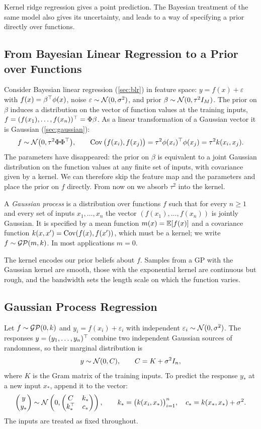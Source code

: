 Kernel ridge regression gives a point prediction. The Bayesian treatment of the same model also gives its uncertainty, and leads to a way of specifying a prior directly over functions.

\subsection{From Bayesian Linear Regression to a Prior over Functions}

Consider Bayesian linear regression (\cref{sec:blr}) in feature space: $y=f(x)+\varepsilon$ with $f(x)=\beta^{\top}\phi(x)$, noise $\varepsilon\sim\mathcal{N}(0,\sigma^2)$, and prior $\beta\sim\mathcal{N}(0,\tau^2I_M)$. The prior on $\beta$ induces a distribution on the vector of function values at the training inputs, $f=(f(x_1),\dots,f(x_n))^{\top}=\Phi\beta$. As a linear transformation of a Gaussian vector it is Gaussian (\cref{sec:gaussian}):
\[
f\sim\mathcal{N}\big(0,\tau^2\Phi\Phi^{\top}\big),\qquad\operatorname{Cov}\big(f(x_i),f(x_j)\big)=\tau^2\phi(x_i)^{\top}\phi(x_j)=\tau^2k(x_i,x_j).
\]
The parameters have disappeared: the prior on $\beta$ is equivalent to a joint Gaussian distribution on the function values at any finite set of inputs, with covariance given by a kernel. We can therefore skip the feature map and the parameters and place the prior on $f$ directly. From now on we absorb $\tau^2$ into the kernel.

\begin{definition}
A \emph{Gaussian process} is a distribution over functions $f$ such that for every $n\ge1$ and every set of inputs $x_1,\dots,x_n$ the vector $(f(x_1),\dots,f(x_n))$ is jointly Gaussian. It is specified by a mean function $m(x)=\mathbb{E}[f(x)]$ and a covariance function $k(x,x')=\operatorname{Cov}(f(x),f(x'))$, which must be a kernel; we write $f\sim\mathcal{GP}(m,k)$. In most applications $m=0$.
\end{definition}

The kernel encodes our prior beliefs about $f$. Samples from a GP with the Gaussian kernel are smooth, those with the exponential kernel are continuous but rough, and the bandwidth sets the length scale on which the function varies.

\subsection{Gaussian Process Regression}

Let $f\sim\mathcal{GP}(0,k)$ and $y_i=f(x_i)+\varepsilon_i$ with independent $\varepsilon_i\sim\mathcal{N}(0,\sigma^2)$. The responses $y=(y_1,\dots,y_n)^{\top}$ combine two independent Gaussian sources of randomness, so their marginal distribution is
\[
y\sim\mathcal{N}(0,C),\qquad C=K+\sigma^2I_n,
\]
where $K$ is the Gram matrix of the training inputs. To predict the response $y_*$ at a new input $x_*$, append it to the vector:
\[
\begin{pmatrix}y\\y_*\end{pmatrix}\sim\mathcal{N}\left(0,\begin{pmatrix}C&k_*\\k_*^{\top}&c_*\end{pmatrix}\right),\qquad k_*=\big(k(x_i,x_*)\big)_{i=1}^n,\quad c_*=k(x_*,x_*)+\sigma^2.
\]
The inputs are treated as fixed throughout.

